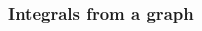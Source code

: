 \documentclass[14pt]{beamer}
\begin{document}
\begin{frame}[t]
\frametitle{Integrals from a graph}

\begin{columns}

\begin{column}{.7\textwidth}
\begin{center}

\end{center}
\end{column}
\end{columns}
\end{frame}
\end{document}

